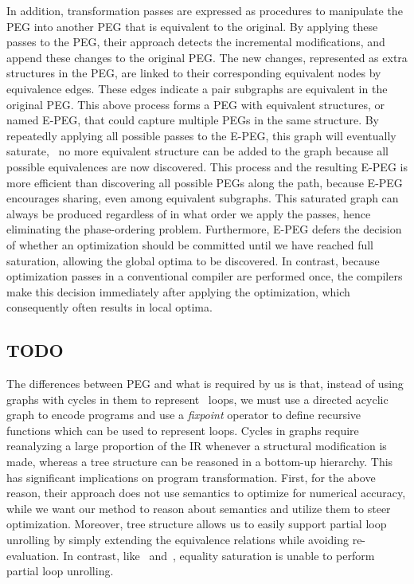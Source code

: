 In addition, transformation passes are expressed as procedures to manipulate
the PEG into another PEG that is equivalent to the original.  By applying these
passes to the PEG, their approach detects the incremental modifications, and
append these changes to the original PEG\@.  The new changes, represented as
extra structures in the PEG, are linked to their corresponding equivalent nodes
by equivalence edges.  These edges indicate a pair subgraphs are equivalent in
the original PEG\@.  This above process forms a PEG with equivalent structures,
or named E-PEG, that could capture multiple PEGs in the same structure.
By repeatedly applying all possible passes to the E-PEG, this graph will
eventually saturate, \ie~no more equivalent structure can be added to the graph
because all possible equivalences are now discovered.  This process and the
resulting E-PEG is more efficient than discovering all possible PEGs along the
path, because E-PEG encourages sharing, even among equivalent subgraphs.  This
saturated graph can always be produced regardless of in what order we apply
the passes, hence eliminating the phase-ordering problem.  Furthermore, E-PEG
defers the decision of whether an optimization should be committed until we
have reached full saturation, allowing the global optima to be discovered.
In contrast, because optimization passes in a conventional compiler are
performed once, the compilers make this decision immediately after applying the
optimization, which consequently often results in local optima.


\subsection{TODO}

The differences between PEG and what is required by us is that, instead of using
graphs with cycles in them to represent \whilelit~loops, we must use a
directed acyclic graph to encode programs and use a \emph{fixpoint} operator
to define recursive functions which can be used to represent loops.  Cycles in
graphs require reanalyzing a large proportion of the IR whenever a structural
modification is made, whereas a tree structure can be reasoned in a bottom-up
hierarchy.  This has significant implications on program transformation.
First, for the above reason, their approach does not use semantics to optimize
for numerical accuracy, while we want our method to reason about semantics
and utilize them to steer optimization.  Moreover, tree structure allows us
to easily support partial loop unrolling by simply extending the equivalence
relations while avoiding re-evaluation.  In contrast, like~\cite{martel09}
and~\cite{damouche15}, equality saturation is unable to perform partial loop
unrolling.

